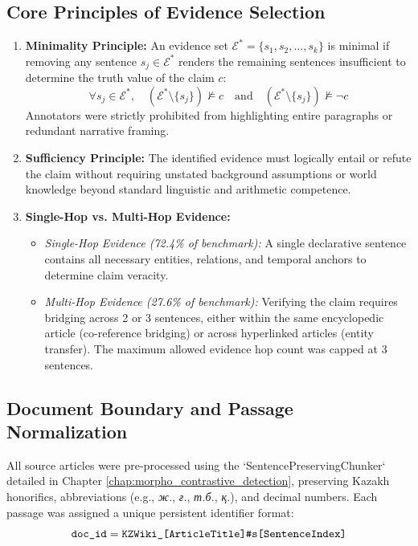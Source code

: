 \subsection{Core Principles of Evidence Selection}
\begin{enumerate}
    \item \textbf{Minimality Principle:} An evidence set $\mathcal{E}^* = \{s_1, s_2, \dots, s_k\}$ is minimal if removing any sentence $s_j \in \mathcal{E}^*$ renders the remaining sentences insufficient to determine the truth value of the claim $c$:
    \begin{equation}
    \forall s_j \in \mathcal{E}^*, \quad (\mathcal{E}^* \setminus \{s_j\}) \not\models c \quad \text{and} \quad (\mathcal{E}^* \setminus \{s_j\}) \not\models \neg c
    \end{equation}
    Annotators were strictly prohibited from highlighting entire paragraphs or redundant narrative framing.

    \item \textbf{Sufficiency Principle:} The identified evidence must logically entail or refute the claim without requiring unstated background assumptions or world knowledge beyond standard linguistic and arithmetic competence.

    \item \textbf{Single-Hop vs. Multi-Hop Evidence:}
    \begin{itemize}
        \item \textit{Single-Hop Evidence (72.4\% of benchmark):} A single declarative sentence contains all necessary entities, relations, and temporal anchors to determine claim veracity.
        \item \textit{Multi-Hop Evidence (27.6\% of benchmark):} Verifying the claim requires bridging across 2 or 3 sentences, either within the same encyclopedic article (co-reference bridging) or across hyperlinked articles (entity transfer). The maximum allowed evidence hop count was capped at 3 sentences.
    \end{itemize}
\end{enumerate}

\subsection{Document Boundary and Passage Normalization}
All source articles were pre-processed using the `SentencePreservingChunker` detailed in Chapter \ref{chap:morpho_contrastive_detection}, preserving Kazakh honorifics, abbreviations (e.g., \textit{ж.}, \textit{ғ.}, \textit{т.б.}, \textit{қ.}), and decimal numbers. Each passage was assigned a unique persistent identifier format:
\begin{equation}
\text{\texttt{doc\_id}} = \text{\texttt{KZWiki\_[ArticleTitle]\#s[SentenceIndex]}}
\end{equation}

